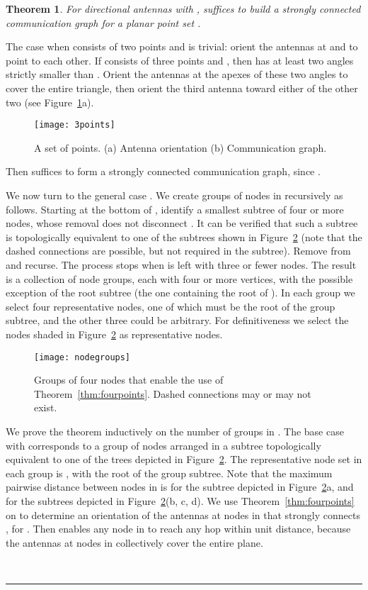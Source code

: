 \documentclass[11pt]{article}
\newtheorem{theorem}{Theorem}
\newcommand{\qed}{\rule{0.5em}{1.5ex}}
\newcommand{\fqed}{{\hfill~\qed}}
\newenvironment{proof}{{\noindent \bf Proof.}}
                      {{\hfill \fqed} \vspace{1em}}
\begin{document}
\begin{theorem}
For directional antennas with ,  suffices
to build a strongly connected communication graph for a planar point set .
\label{thm:90main}
\end{theorem}
\begin{proof}
The case when  consists of two points  and  is trivial: orient the antennas
at  and  to point to each other.
If  consists of three points  and , then  has at least two angles
strictly smaller than . Orient the antennas at the apexes of these two angles
to cover the entire triangle, then orient the third antenna toward either of the other two
(see Figure~\ref{fig:3points}a).
\begin{figure}[hptb]
\centering
\texttt{[image: 3points]}
\caption{A set  of  points. (a) Antenna orientation  (b) Communication graph.}
\label{fig:3points}
\end{figure}
Then  suffices to form a strongly connected communication graph, since
.

We now turn to the general case .
We create groups of nodes in  recursively as follows.
Starting at the bottom of , identify a smallest subtree
 of four or more nodes, whose removal does not disconnect
. It can be verified that such a subtree is topologically
equivalent to one of the subtrees shown in Figure~\ref{fig:nodegroups} (note
that the dashed connections are possible, but not required in the subtree).
Remove  from  and recurse. The process stops when 
is left with three or fewer nodes.
The result is a collection  of node groups, each with four or more vertices,
with the possible exception of the root subtree (the one containing
the root of ). In each group we select four representative nodes, one
of which must be the root of the group subtree, and the other three could be
arbitrary.
For definitiveness we select the nodes shaded in Figure~\ref{fig:nodegroups} as
representative nodes.

\begin{figure}[hptb]
\centering
\texttt{[image: nodegroups]}
\caption{Groups of four nodes that enable the use of Theorem~\ref{thm:fourpoints}. Dashed connections may or may not exist.}
\label{fig:nodegroups}
\end{figure}


We prove the theorem inductively on the number of groups  in .
The base case with  corresponds to a group of nodes arranged in a subtree
topologically equivalent to one of the trees depicted in Figure~\ref{fig:nodegroups}.
The representative node set in each group is , with  the
root of the group subtree. Note that the maximum pairwise distance between
nodes in  is  for the subtree depicted in
Figure~\ref{fig:nodegroups}a, and  for the subtrees
depicted in Figure~\ref{fig:nodegroups}(b, c, d).
We use Theorem~\ref{thm:fourpoints} on  to determine an orientation of the
antennas at nodes in  that strongly connects , for .
Then  enables any node in  to reach any hop
within unit distance, because the antennas at nodes in 
collectively cover the entire plane.


\end{proof}
\end{document}
